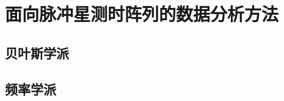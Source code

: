 \chapter{面向脉冲星测时阵列的数据分析方法}
\label{chap:data analysis methods for pta}
\section{贝叶斯学派}
\section{频率学派}